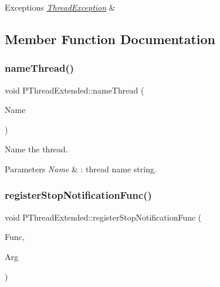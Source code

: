 \begin{DoxyExceptions}{Exceptions}
{\em \hyperlink{classThreadException}{Thread\+Exception}} & \\
\hline
\end{DoxyExceptions}


\subsection{Member Function Documentation}
\mbox{\label{classPThreadExtended_a1df3e69e3cfae6f56e12da3ce80446d4}} 
\subsubsection{\texorpdfstring{name\+Thread()}{nameThread()}}
{\footnotesize\ttfamily void P\+Thread\+Extended\+::name\+Thread (\begin{DoxyParamCaption}\item[{string}]{Name }\end{DoxyParamCaption})\hspace{0.3cm}{\ttfamily [inline]}}

Name the thread. 
\begin{DoxyParams}{Parameters}
{\em Name} & \+: thread name string. \\
\hline
\end{DoxyParams}
\mbox{\label{classPThreadExtended_aa9a16de484a20e787223ee8750e6d7c1}} 
\subsubsection{\texorpdfstring{register\+Stop\+Notification\+Func()}{registerStopNotificationFunc()}}
{\footnotesize\ttfamily void P\+Thread\+Extended\+::register\+Stop\+Notification\+Func (\begin{DoxyParamCaption}\item[{\hyperlink{group__FUNC__DEFS_ga164076b53d35e4dba4c51bb336c15dab}{P\+Thread\+Notification\+Func\+Type}}]{Func,  }\item[{void $\ast$}]{Arg }\end{DoxyParamCaption})\hspace{0.3cm}{\ttfamily [inline]}}

